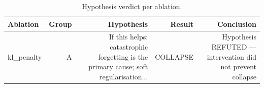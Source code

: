 \begin{table}[htbp]
\centering
\caption{Hypothesis verdict per ablation.}
\label{tab:hypothesis}
\begin{tabular}{lrrrr}
\toprule
\textbf{Ablation} & \textbf{Group} & \textbf{Hypothesis} & \textbf{Result} & \textbf{Conclusion} \\
\midrule
kl\_penalty & A & If this helps: catastrophic forgetting is the primary cause; soft regularisation... & COLLAPSE & Hypothesis REFUTED — intervention did not prevent collapse \\
\bottomrule
\end{tabular}
\end{table}